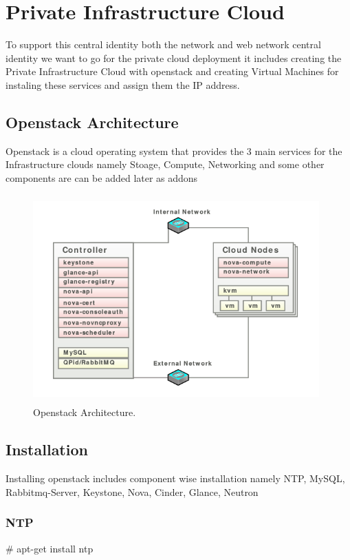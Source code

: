\documentclass[12pt]{report}
\begin{document}
\chapter{Private Infrastructure Cloud}
To support this central identity both the network and web network central identity we want to go for the private cloud deployment it includes creating the Private Infrastructure Cloud with openstack and creating Virtual Machines for instaling these services and assign them the IP address.

\section{Openstack Architecture}
Openstack is a cloud operating system that provides the 3 main services for the Infrastructure clouds namely Stoage, Compute, Networking and some other components are can be added later as addons
\underline{} \newline
\begin{figure}[H]
	\begin{center}
	\includegraphics[width=11cm,height=8cm]{./openstack_1.png}
	\caption{ Openstack Architecture.\label{fig:Openstack Architecture }}
	\end{center}
\end{figure}

\section{Installation}

Installing openstack includes component wise installation namely NTP, MySQL, Rabbitmq-Server, Keystone, Nova, Cinder, Glance, Neutron
\subsection{NTP}
\# apt-get install ntp
\end{document}
